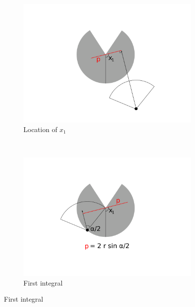 \documentclass[a4paper,10pt,reqno,oneside]{amsart}
\begin{document}
\begin{figure}[t]
        \centering
	\begin{subfigure}[t]{0.45\textwidth}
                \centering
		\includegraphics[width=1\textwidth, trim= 6cm 1cm 6cm 0.3cm]{imgs/x1.pdf}
                \caption{Location of $x_1$ }
                \label{f:xOne}
        \end{subfigure}%
	~ 
	\begin{subfigure}[t]{0.45\textwidth}
                \centering
		\includegraphics[width=1\textwidth, trim= 6cm 1cm 6cm 0.3cm]{imgs/firstIntegral.pdf}
                \caption{First integral}
                \label{f:firstInt}
        \end{subfigure}%
	 

\end{figure}
\end{document}
